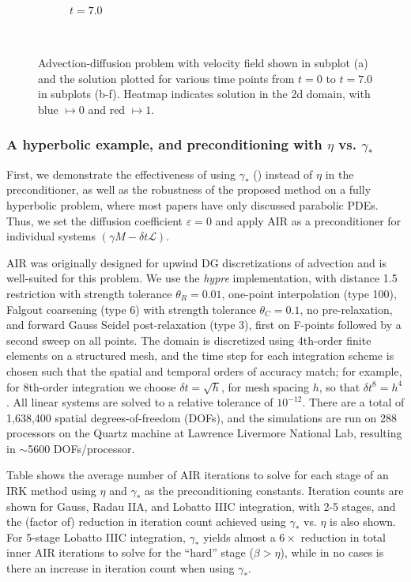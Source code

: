 \documentclass[review]{siamart}
\begin{document}
\begin{figure}[!htb]
\begin{subfigure}[b]{0.3\textwidth}
    \caption{$t = 7.0$}
  \end{subfigure}
  \\\vspace{2ex}
      \caption{Advection-diffusion problem with velocity field shown in
      subplot (a) and the solution plotted for various time points from
      $t=0$ to $t = 7.0$ in subplots (b-f). Heatmap indicates solution in the
      2d domain, with blue $\mapsto 0$ and red $\mapsto 1$.}
  \label{fig:ad_advdiff}
\end{figure}

\subsubsection{A hyperbolic example, and preconditioning with $\eta$ vs. $\gamma_*$}
\label{sec:numerics:dg:const}

First, we demonstrate the effectiveness of using $\gamma_*$ ()
instead of $\eta$ in the preconditioner, as well as the robustness of the proposed
method on a fully hyperbolic problem, where most papers have only discussed parabolic
PDEs. Thus, we set the diffusion coefficient $\varepsilon = 0$
and apply AIR as a preconditioner for individual systems
$(\gamma M - \delta t\mathcal{L})$.

AIR was originally designed for upwind DG discretizations of advection
and is well-suited for this problem. We use the \textit{hypre} implementation,
with distance 1.5 restriction with strength tolerance $\theta_R=0.01$, one-point
interpolation (type 100), Falgout coarsening (type 6) with strength tolerance
$\theta_C=0.1$, no pre-relaxation, and forward Gauss Seidel
post-relaxation (type 3), first on F-points followed by a second sweep on
all points. The domain is discretized using 4th-order finite elements on a
structured mesh, and the time step for each integration scheme is chosen
such that the spatial and temporal orders of accuracy match; for example,
for 8th-order integration we choose $\delta t = \sqrt{h}$, for mesh spacing
$h$, so that $\delta t^8 = h^4$. All linear systems are solved to a relative
tolerance of $10^{-12}$. There are a total of 1,638,400 spatial degrees-of-freedom
(DOFs), and the simulations are run on 288 processors on the Quartz machine at
Lawrence Livermore National Lab, resulting in $\sim$5600 DOFs/processor.

Table  shows the average number of AIR iterations to solve for
each stage of an IRK method using $\eta$ and $\gamma_*$ as the preconditioning
constants. Iteration counts are shown for Gauss, Radau IIA, and Lobatto IIIC integration,
with 2-5 stages, and the (factor of) reduction in iteration count achieved using $\gamma_*$
vs. $\eta$ is also shown. For 5-stage Lobatto IIIC integration, $\gamma_*$ yields
almost a $6\times$ reduction in total inner AIR iterations to solve for the
``hard'' stage ($\beta > \eta$), while in no cases is there an increase in
iteration count when using $\gamma_*$.
\end{document}
